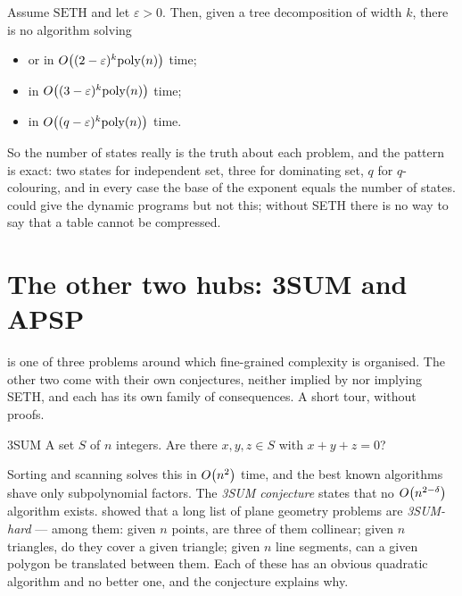 \begin{theorem}\label{thm:seth-treewidth}
Assume $\mathrm{SETH}$ and let $\varepsilon > 0$. Then, given a tree
decomposition of width $k$, there is no algorithm solving
\begin{itemize}[leftmargin=*,nosep]
  \item {} or  in
        $O\!\left((2-\varepsilon)^k \mathrm{poly}(n)\right)$ time;
  \item {} in $O\!\left((3-\varepsilon)^k \mathrm{poly}(n)\right)$ time;
  \item {} in $O\!\left((q-\varepsilon)^k \mathrm{poly}(n)\right)$ time.
\end{itemize}
\end{theorem}

So the number of states really is the truth about each problem, and the pattern
is exact: two states for independent set, three for dominating set, $q$ for
$q$-colouring, and in every case the base of the exponent equals the number of
states.  could give the dynamic programs but not this;
without SETH there is no way to say that a table cannot be compressed.

\section{The other two hubs: 3SUM and APSP}
\label{sec:3sum-apsp}

 is one of three problems around which fine-grained
complexity is organised. The other two come with their own conjectures, neither
implied by nor implying SETH, and each has its own family of consequences. A
short tour, without proofs.

\begin{probdef}{3SUM}
  \instance A set $S$ of $n$ integers.
  \question Are there $x,y,z \in S$ with $x + y + z = 0$?
\end{probdef}

Sorting and scanning solves this in $O\!\left(n^2\right)$ time, and the best known
algorithms shave only subpolynomial factors. The \emph{3SUM conjecture} states
that no $O\!\left(n^{2-\delta}\right)$ algorithm exists. \citet{GajentaanOvermars1995}
showed that a long list of plane geometry problems are \emph{3SUM-hard} ---
among them: given $n$ points, are three of them collinear; given $n$ triangles,
do they cover a given triangle; given $n$ line segments, can a given polygon be
translated between them. Each of these has an obvious quadratic algorithm and
no better one, and the conjecture explains why.

